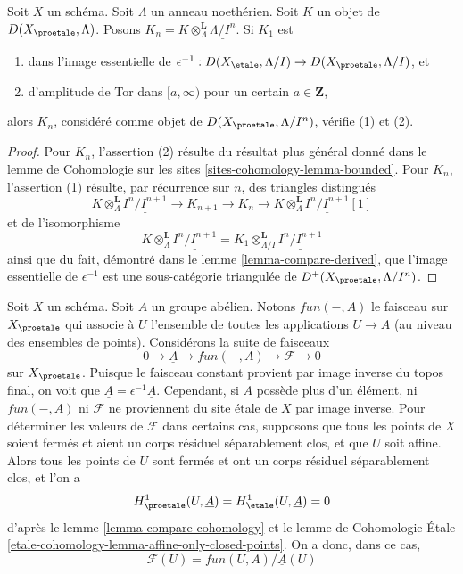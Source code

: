 \begin{lemma}
\label{lemma-compare-truncations}
Soit $X$ un schéma. Soit $\Lambda$ un anneau noethérien.
Soit $K$ un objet de $D(X_\proetale, \Lambda)$.
Posons $K_n = K \otimes_\Lambda^\mathbf{L} \underline{\Lambda/I^n}$.
Si $K_1$ est
\begin{enumerate}
\item dans l'image essentielle de
$\epsilon^{-1} :D(X_\etale, \Lambda/I) \to D(X_\proetale, \Lambda/I)$, et
\item d'amplitude de Tor dans $[a,\infty)$ pour un certain $a \in \mathbf{Z}$,
\end{enumerate}
alors $K_n$, considéré comme objet de $D(X_\proetale, \Lambda/I^n)$, vérifie (1) et (2).
\end{lemma}

\begin{proof}
Pour $K_n$, l'assertion (2) résulte du résultat plus général donné dans le
lemme de Cohomologie sur les sites \ref{sites-cohomology-lemma-bounded}.
Pour $K_n$, l'assertion (1) résulte, par récurrence sur $n$, des
triangles distingués
$$
K \otimes_\Lambda^\mathbf{L} \underline{I^n/I^{n + 1}} \to
K_{n + 1} \to
K_n \to
K \otimes_\Lambda^\mathbf{L} \underline{I^n/I^{n + 1}}[1]
$$
et de l'isomorphisme
$$
K \otimes_\Lambda^\mathbf{L} \underline{I^n/I^{n + 1}} =
K_1 \otimes_{\Lambda/I}^\mathbf{L} \underline{I^n/I^{n + 1}}
$$
ainsi que du fait, démontré dans le lemme \ref{lemma-compare-derived},
que l'image essentielle de $\epsilon^{-1}$ est une sous-catégorie triangulée
de $D^+(X_\proetale, \Lambda/I^n)$.
\end{proof}

\begin{example}
\label{example-functions-mod-locally-constant-functions}
Soit $X$ un schéma. Soit $A$ un groupe abélien. Notons
$fun(-, A)$ le faisceau sur $X_\proetale$ qui associe à $U$
l'ensemble de toutes les applications $U \to A$ (au niveau des ensembles de points).
Considérons la suite de faisceaux
$$
0 \to \underline{A} \to fun(-, A) \to \mathcal{F} \to 0
$$
sur $X_\proetale$. Puisque le faisceau constant provient par image inverse du topos
final, on voit que $\underline{A} = \epsilon^{-1}\underline{A}$.
Cependant, si $A$ possède plus d'un élément, ni $fun(-, A)$
ni $\mathcal{F}$ ne proviennent du site \'etale de $X$ par image inverse.
Pour déterminer les valeurs de $\mathcal{F}$ dans certains cas, supposons que
tous les points de $X$ soient fermés et aient un corps résiduel séparablement clos,
et que $U$ soit affine. Alors tous les points de $U$ sont fermés et ont un corps
résiduel séparablement clos, et l'on a
$$
H^1_\proetale(U, \underline{A}) =
H^1_\etale(U, \underline{A}) = 0
$$
d'après le lemme \ref{lemma-compare-cohomology} et le
lemme de Cohomologie \'Etale
\ref{etale-cohomology-lemma-affine-only-closed-points}.
On a donc, dans ce cas,
$$
\mathcal{F}(U) = fun(U, A)/\underline{A}(U)
$$
\end{example}





